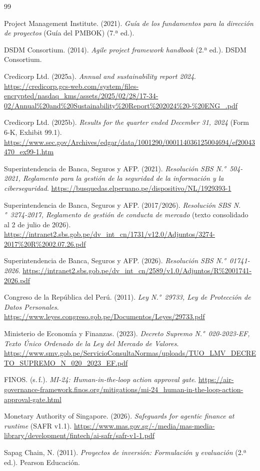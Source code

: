 \documentclass[11pt]{article}
\begin{document}
\begin{thebibliography}{99}

Project Management Institute. (2021). \textit{Guía de los fundamentos para la dirección de proyectos} (Guía del PMBOK) (7.ª ed.).

DSDM Consortium. (2014). \textit{Agile project framework handbook} (2.ª ed.). DSDM Consortium.

Credicorp Ltd. (2025a). \textit{Annual and sustainability report 2024}. \url{https://credicorp.gcs-web.com/system/files-encrypted/nasdaq_kms/assets/2025/02/28/17-34-02/Annual%20and%20Sustainability%20Report%202024%20-%20ENG_.pdf}

Credicorp Ltd. (2025b). \textit{Results for the quarter ended December 31, 2024} (Form 6-K, Exhibit 99.1). \url{https://www.sec.gov/Archives/edgar/data/1001290/000114036125004694/ef20043470_ex99-1.htm}

Superintendencia de Banca, Seguros y AFP. (2021). \textit{Resolución SBS N.°~504-2021, Reglamento para la gestión de la seguridad de la información y la ciberseguridad}. \url{https://busquedas.elperuano.pe/dispositivo/NL/1929393-1}

Superintendencia de Banca, Seguros y AFP. (2017/2026). \textit{Resolución SBS N.°~3274-2017, Reglamento de gestión de conducta de mercado} (texto consolidado al 2 de julio de 2026). \url{https://intranet2.sbs.gob.pe/dv_int_cn/1731/v12.0/Adjuntos/3274-2017%20R%2002.07.26.pdf}

Superintendencia de Banca, Seguros y AFP. (2026). \textit{Resolución SBS N.°~01741-2026}. \url{https://intranet2.sbs.gob.pe/dv_int_cn/2589/v1.0/Adjuntos/R%2001741-2026.pdf}

Congreso de la República del Perú. (2011). \textit{Ley N.°~29733, Ley de Protección de Datos Personales}. \url{https://www.leyes.congreso.gob.pe/Documentos/Leyes/29733.pdf}

Ministerio de Economía y Finanzas. (2023). \textit{Decreto Supremo N.°~020-2023-EF, Texto Único Ordenado de la Ley del Mercado de Valores}. \url{https://www.smv.gob.pe/ServicioConsultaNormas/uploads/TUO_LMV_DECRETO_SUPREMO_N_020_2023_EF.pdf}

FINOS. (s.\,f.). \textit{MI-24: Human-in-the-loop action approval gate}. \url{https://air-governance-framework.finos.org/mitigations/mi-24_human-in-the-loop-action-approval-gate.html}

Monetary Authority of Singapore. (2026). \textit{Safeguards for agentic finance at runtime} (SAFR v1.1). \url{https://www.mas.gov.sg/-/media/mas-media-library/development/fintech/ai-safr/safr-v1-1.pdf}

Sapag Chain, N. (2011). \textit{Proyectos de inversión: Formulación y evaluación} (2.ª ed.). Pearson Educación.

\end{thebibliography}
\end{document}
